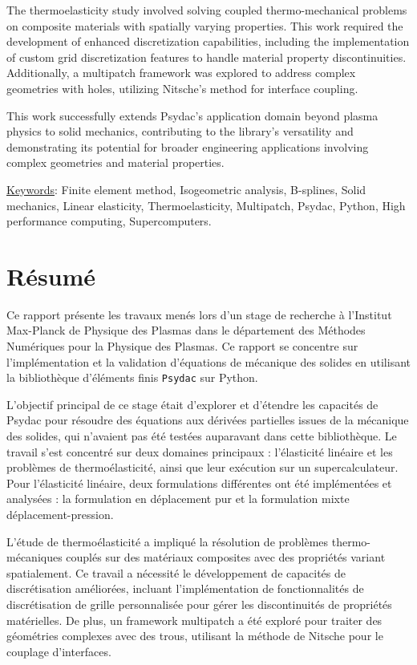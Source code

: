 \documentclass[a4paper,12pt,twoside]{report}
\begin{document}
The thermoelasticity study involved solving coupled thermo-mechanical problems on composite materials with spatially varying properties. This work required the development of enhanced discretization capabilities, including the implementation of custom grid discretization features to handle material property discontinuities. Additionally, a multipatch framework was explored to address complex geometries with holes, utilizing Nitsche's method for interface coupling.

This work successfully extends Psydac's application domain beyond plasma physics to solid mechanics, contributing to the library's versatility and demonstrating its potential for broader engineering applications involving complex geometries and material properties. 

\vspace{0.4cm}

\underline{Keywords}: Finite element method, Isogeometric analysis, B-splines, Solid mechanics, Linear elasticity, Thermoelasticity, Multipatch, Psydac, Python, High performance computing, Supercomputers.

\section*{Résumé}

Ce rapport présente les travaux menés lors d'un stage de recherche à l'Institut Max-Planck de Physique des Plasmas dans le département des Méthodes Numériques pour la Physique des Plasmas. Ce rapport se concentre sur l'implémentation et la validation d'équations de mécanique des solides en utilisant la bibliothèque d'éléments finis \texttt{Psydac} sur Python.

L'objectif principal de ce stage était d'explorer et d'étendre les capacités de Psydac pour résoudre des équations aux dérivées partielles issues de la mécanique des solides, qui n'avaient pas été testées auparavant dans cette bibliothèque. Le travail s'est concentré sur deux domaines principaux : l'élasticité linéaire et les problèmes de thermoélasticité, ainsi que leur exécution sur un supercalculateur. Pour l'élasticité linéaire, deux formulations différentes ont été implémentées et analysées : la formulation en déplacement pur et la formulation mixte déplacement-pression.

L'étude de thermoélasticité a impliqué la résolution de problèmes thermo-mécaniques couplés sur des matériaux composites avec des propriétés variant spatialement. Ce travail a nécessité le développement de capacités de discrétisation améliorées, incluant l'implémentation de fonctionnalités de discrétisation de grille personnalisée pour gérer les discontinuités de propriétés matérielles. De plus, un framework multipatch a été exploré pour traiter des géométries complexes avec des trous, utilisant la méthode de Nitsche pour le couplage d'interfaces.
\end{document}
